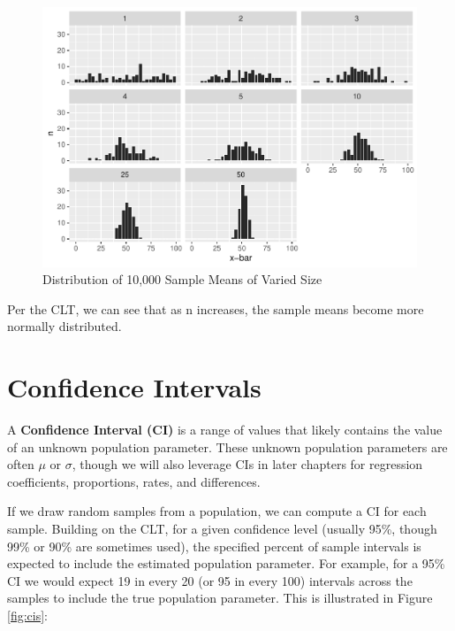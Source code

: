 \documentclass[]{book}
\begin{document}
\begin{figure}

{\centering \includegraphics{_main_files/figure-latex/unnamed-chunk-39-1} 

}

\caption{Distribution of 10,000 Sample Means of Varied Size}\label{fig:unnamed-chunk-39}
\end{figure}

Per the CLT, we can see that as n increases, the sample means become more normally distributed.

\hypertarget{confidence-intervals}{%
\section{Confidence Intervals}\label{confidence-intervals}}

A \textbf{Confidence Interval (CI)} is a range of values that likely contains the value of an unknown population parameter. These unknown population parameters are often \(\mu\) or \(\sigma\), though we will also leverage CIs in later chapters for regression coefficients, proportions, rates, and differences.

If we draw random samples from a population, we can compute a CI for each sample. Building on the CLT, for a given confidence level (usually 95\%, though 99\% or 90\% are sometimes used), the specified percent of sample intervals is expected to include the estimated population parameter. For example, for a 95\% CI we would expect 19 in every 20 (or 95 in every 100) intervals across the samples to include the true population parameter. This is illustrated in Figure \ref{fig:cis}:
\end{document}
